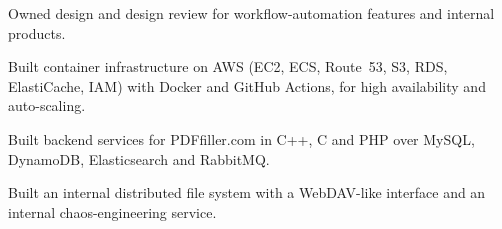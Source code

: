 \begin{points}
  \item Owned design and design review for workflow-automation features and internal
        products.
  \item Built container infrastructure on AWS (EC2, ECS, Route~53, S3, RDS, ElastiCache,
        IAM) with Docker and GitHub Actions, for high availability and auto-scaling.
\end{points}

\begin{points}
  \item Built backend services for PDFfiller.com in C++, C and PHP over MySQL, DynamoDB,
        Elasticsearch and RabbitMQ.
  \item Built an internal distributed file system with a WebDAV-like interface and an
        internal chaos-engineering service.
\end{points}


